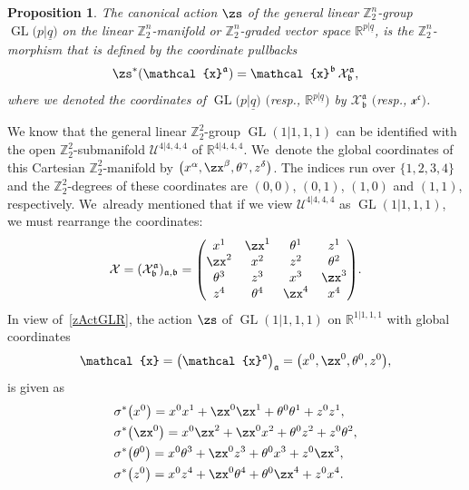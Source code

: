 \documentclass[pdftex]{sigma}%
\newcommand{\op}[1]{\operatorname{#1}}
\DeclareMathOperator{\GL}{GL}
\newcommand{\R}{{\mathbb R}}
\newcommand{\Z}{{\mathbb Z}}
\def\ul{\underline}
\def\ul{\underline}
\newcommand{\0}{\otimes}
\newcommand{\z}{\Z_2^n}
\numberwithin{equation}{section}
\newtheorem{Proposition}[Theorem]{Proposition}
 { \theoremstyle{definition}
\newtheorem{Definition}[Theorem]{Definition}
\newtheorem{Example}[Theorem]{Example}
\newtheorem{Remark}[Theorem]{Remark} }
\begin{document}
\begin{Proposition}
The canonical action $\zs$ of the general linear $\z$-group $\op{GL}\big(p|\ul q\big)$ on the linear $\z$-manifold or $\z$-graded vector space $\R^{p|\ul q}$, is the $\z$-morphism that is defined by the coordinate pullbacks
\begin{gather}\label{zActGLR}
\zs^*(\mathcal{x}^{\mathfrak{a}})=\mathcal{x}^{\mathfrak{b}}\,\mathcal{X}^{\mathfrak{a}}_{\mathfrak{b}},
\end{gather}
where we denoted the coordinates of $\op{GL}\big(p|\ul q\big)$ $($resp., $\R^{p|\ul q})$ by $\mathcal{X}^{\mathfrak{a}}_\mathfrak{b}$ $($resp., $\mathcal{x}^{\mathfrak{c}})$.
\end{Proposition}

\begin{Example}
We know that the general linear $\Z_2^2$-group $\GL(1|1,1,1)$ can be identified with the open $\Z^2_2$-submanifold $\mathcal{U}^{4|4,4,4}$ of $\R^{4|4,4,4}$. We~denote the global coordinates of this Cartesian $\Z^2_2$-manifold by $\big(x^\alpha, \zx^\beta, \theta^\gamma,z^\delta\big)$. The indices run over $\{1,2,3,4\}$ and the $\Z_2^2$-degrees of these coordinates are $(0,0)$, $(0,1)$, $(1,0)$ and $(1,1)$, respectively. We~already mentioned that if we view $\mathcal{U}^{4|4,4,4}$ as $\op{GL}(1|1,1,1)$, we must rearrange the coordinates:
\[
\mathcal{X}=(\mathcal{X}^{\mathfrak{a}}_{\mathfrak{b}})_{\mathfrak{a},\mathfrak{b}}=\left(
\begin{matrix}
 x^1 & \zx^1 & \theta^1 & z^1 \\
 \zx^2 &x^2 & z^2 & \theta^2 \\
 \theta^3 & z^3 & x^3 & \zx^3\\
 z^4 & \theta^4& \zx^4 & x^4\\
\end{matrix}
\right)\!.
\]
In view of~\eqref{zActGLR}, the action $\zs$ of $\op{GL}(1|1,1,1)$ on $\R^{1|1,1,1}$ with global co\-or\-di\-nates
\[
\mathcal{x}=\big(\mathcal{x}^{\mathfrak{a}}\big)_{\mathfrak{a}}=\big(x^0, \zx^0, \theta^0 , z^0\big),
\]
is given as
%
\begin{align*}
& \sigma^*\big(x^0\big) = x^0x^1 + \zx^0 \zx^1 + \theta^0 \theta^1 + z^0 z^1,\\
& \sigma^*\big(\zx^0\big) = x^0 \zx^2 + \zx^0 x^2 + \theta^0 z^2 + z^0 \theta^2,\\
& \sigma^*\big(\theta^0\big) = x^0 \theta^3 + \zx^0 z^3 + \theta^0 x^3 + z^0 \zx^3,\\
& \sigma^*\big(z^0\big) = x^0 z^4 + \zx^0 \theta^4 + \theta^0 \zx^4 + z^0 x^4.
\end{align*}
%
\end{Example}
\end{document}
